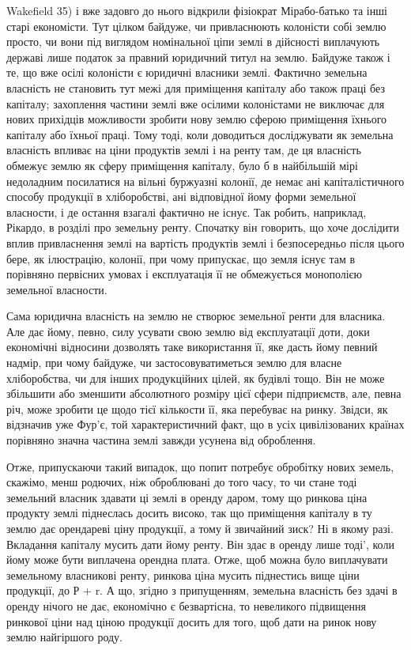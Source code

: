 Wakefield 35) і вже задовго до нього відкрили фізіократ Мірабо-батько та інші
старі економісти. Тут цілком байдуже, чи привласнюють колоністи собі землю
просто, чи вони під виглядом номінальної ціпи землі в дійсності виплачують державі
лише податок за правний юридичний титул на землю. Байдуже також і те, що вже
осілі колоністи є юридичні власники землі. Фактично земельна власність не
становить тут межі для приміщення капіталу або також праці без капіталу;
захоплення частини землі вже осілими колоністами не виключає для нових
прихідців можливости зробити нову землю сферою приміщення їхнього капіталу
або їхньої праці. Тому тоді, коли доводиться досліджувати як земельна власність
впливає на ціни продуктів землі і на ренту там, де ця власність обмежує
землю як сферу приміщення капіталу, було б в найбільшій мірі недоладним
посилатися на вільні буржуазні колонії, де немає ані капіталістичного способу
продукції в хліборобстві, ані відповідної йому форми земельної власности, і де
остання взагалі фактично не існує. Так робить, наприклад, Рікардо, в розділі
про земельну ренту. Спочатку він говорить, що хоче дослідити вплив привласнення
землі на вартість продуктів землі і безпосередньо після цього бере, як
ілюстрацію, колонії, при чому припускає, що земля існує там в порівняно
первісних умовах і експлуатація її не обмежується монополією земельної
власности.

Сама юридична власність на землю не створює земельної ренти для власника.
Але дає йому, певно, силу усувати свою землю від експлуатації доти,
доки економічні відносини дозволять таке використання її, яке дасть йому
певний надмір, при чому байдуже, чи застосовуватиметься землю для власне
хліборобства, чи для інших продукційних цілей, як будівлі тощо. Він не може
збільшити або зменшити абсолютного розміру цієї сфери підприємств, але, певна
річ, може зробити це щодо тієї кількости її, яка перебуває на ринку. Звідси,
як відзначив уже Фур’є, той характеристичний факт, що в усіх цивілізованих
країнах порівняно значна частина землі завжди усунена від оброблення.

Отже, припускаючи такий випадок, що попит потребує обробітку нових
земель, скажімо, менш родючих, ніж оброблювані до того часу, то чи стане
тоді земельний власник здавати ці землі в оренду даром, тому що ринкова
ціна продукту землі піднеслась досить високо, так що приміщення капіталу
в ту землю дає орендареві ціну продукції, а тому й звичайний зиск? Ні в якому
разі. Вкладання капіталу мусить дати йому ренту. Він здає в оренду лише тоді',
коли йому може бути виплачена орендна плата. Отже, щоб можна було виплачувати
земельному власникові ренту, ринкова ціна мусить піднестись вище
ціни продукції, до Р + r. А що, згідно з припущенням, земельна власність
без здачі в оренду нічого не дає, економічно є безвартісна, то невеликого підвищення
ринкової ціни над ціною продукції досить для того, щоб дати на ринок
нову землю найгіршого роду.

